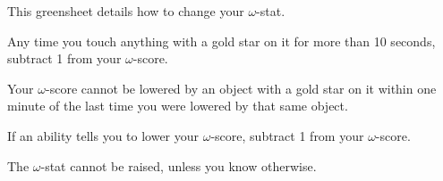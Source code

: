 \documentclass[green]{guildcamp1}
\begin{document}
\name{\gVirus{}}

This greensheet details how to change your $\omega$-stat.

\begin{enum}[lowering]
  \item Any time you touch anything with a gold star  on it for more than 10 seconds, subtract 1 from your $\omega$-score.
  \item Your $\omega$-score cannot be lowered by an object with a gold star on it within one minute of the last time you were lowered by that same object.
  \item If an ability tells you to lower your $\omega$-score, subtract 1 from your $\omega$-score.

\end{enum}

The $\omega$-stat cannot be raised, unless you know otherwise.
\end{document}
